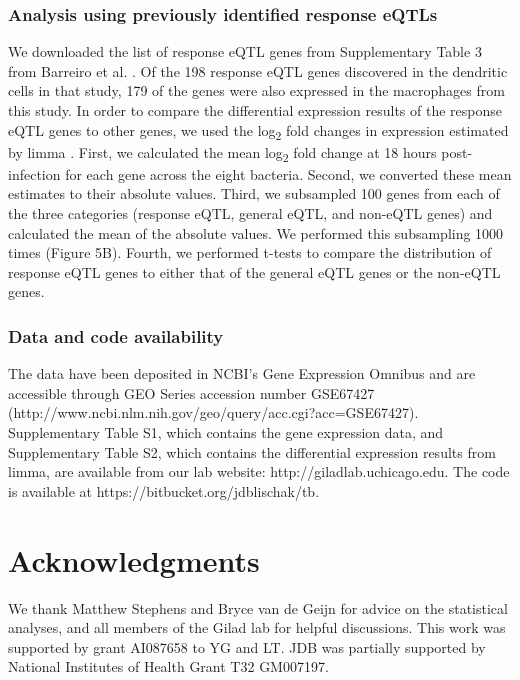 \subsubsection{Analysis using previously identified response
eQTLs}\label{analysis-using-previously-identified-response-eqtls}

We downloaded the list of response eQTL genes from Supplementary Table 3
from Barreiro et al. \citep{Barreiro2012}. Of the 198 response eQTL genes
discovered in the dendritic cells in that study, 179 of the genes were
also expressed in the macrophages from this study. In order to compare
the differential expression results of the response eQTL genes to other
genes, we used the log\textsubscript{2} fold changes in expression
estimated by limma \citep{Ritchie2015}. First, we calculated the mean
log\textsubscript{2} fold change at 18 hours post-infection for each
gene across the eight bacteria. Second, we converted these mean
estimates to their absolute values. Third, we subsampled 100 genes from
each of the three categories (response eQTL, general eQTL, and non-eQTL
genes) and calculated the mean of the absolute values. We performed this
subsampling 1000 times (Figure 5B). Fourth, we performed t-tests to
compare the distribution of response eQTL genes to either that of the
general eQTL genes or the non-eQTL genes.

\subsubsection{Data and code
availability}\label{data-and-code-availability}

The data have been deposited in NCBI's Gene Expression Omnibus
\citep{Edgar2002} and are accessible through GEO Series accession number
GSE67427 (http://www.ncbi.nlm.nih.gov/geo/query/acc.cgi?acc=GSE67427).
Supplementary Table S1, which contains the gene expression data, and
Supplementary Table S2, which contains the differential expression
results from limma, are available from our lab website:
http://giladlab.uchicago.edu. The code is available at
https://bitbucket.org/jdblischak/tb.

\section{Acknowledgments}\label{acknowledgments}

We thank Matthew Stephens and Bryce van de Geijn for advice on the
statistical analyses, and all members of the Gilad lab for helpful
discussions. This work was supported by grant AI087658 to YG and LT. JDB
was partially supported by National Institutes of Health Grant T32
GM007197.

